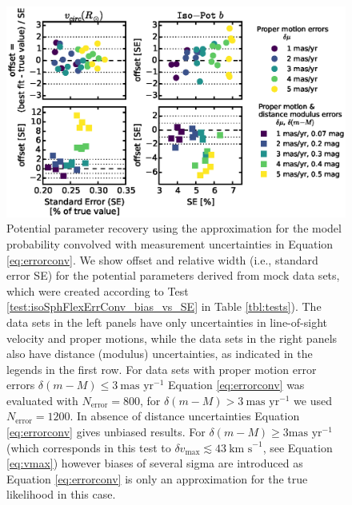 \begin{figure}[!htbp]
\centering
\includegraphics[width=\columnwidth]{figs/isoSphFlexErrConv_bias_vs_SE.eps}
\caption{Potential parameter recovery using the approximation for the model probability convolved with measurement uncertainties in Equation \ref{eq:errorconv}. We show  \pdf{} offset and relative width (i.e., standard error SE) for the potential parameters derived from mock data sets, which were created according to Test \ref{test:isoSphFlexErrConv_bias_vs_SE} in Table \ref{tbl:tests}). The data sets in the left panels have only uncertainties in line-of-sight velocity and proper motions, while the data sets in the right panels also have distance (modulus) uncertainties, as indicated in the legends in the first row. For data sets with proper motion error errors $\delta(m-M) \leq 3 \ \text{mas yr}^{-1}$ Equation \ref{eq:errorconv} was evaluated with $N_\text{error}=800$, for $\delta(m-M) > 3 \ \text{mas yr}^{-1}$ we used $N_\text{error}=1200$. In absence of distance uncertainties Equation \ref{eq:errorconv} gives unbiased results. For $\delta(m-M) \geq 3 \text{mas yr}^{-1}$ (which corresponds in this test to $\delta v_\text{max} \lesssim 43 \ \text{km s}^{-1}$, see Equation \ref{eq:vmax}) however biases of several sigma are introduced as Equation \ref{eq:errorconv} is only an approximation for the true likelihood in this case.}
\label{fig:isoSphFlexErrConv_bias_vs_SE}
\end{figure}





